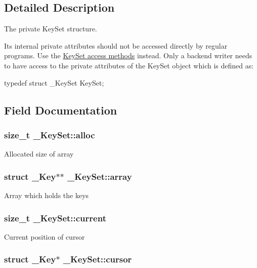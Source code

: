 \subsection{Detailed Description}
The private KeySet structure.

Its internal private attributes should not be accessed directly by regular programs. Use the \hyperlink{group__keyset}{KeySet access methods} instead. Only a backend writer needs to have access to the private attributes of the KeySet object which is defined as: 
\begin{DoxyCode}
typedef struct _KeySet KeySet;
\end{DoxyCode}
 

\subsection{Field Documentation}
\hypertarget{struct__KeySet_ac421dbe2138bb4317996a480a6dae904}{
\subsubsection[{alloc}]{\setlength{\rightskip}{0pt plus 5cm}size\_\-t {\bf \_\-KeySet::alloc}}}
\label{struct__KeySet_ac421dbe2138bb4317996a480a6dae904}
Allocated size of array \hypertarget{struct__KeySet_ae1d1a4e056f483d59503d85d639e186b}{
\subsubsection[{array}]{\setlength{\rightskip}{0pt plus 5cm}struct {\bf \_\-Key}$\ast$$\ast$ {\bf \_\-KeySet::array}}}
\label{struct__KeySet_ae1d1a4e056f483d59503d85d639e186b}
Array which holds the keys \hypertarget{struct__KeySet_a68da1e55ecaf7e8d555cf61c8fda95d9}{
\subsubsection[{current}]{\setlength{\rightskip}{0pt plus 5cm}size\_\-t {\bf \_\-KeySet::current}}}
\label{struct__KeySet_a68da1e55ecaf7e8d555cf61c8fda95d9}
Current position of cursor \hypertarget{struct__KeySet_ae1f826d1e8848e43e4432d1bc8316e65}{
\subsubsection[{cursor}]{\setlength{\rightskip}{0pt plus 5cm}struct {\bf \_\-Key}$\ast$ {\bf \_\-KeySet::cursor}}}
